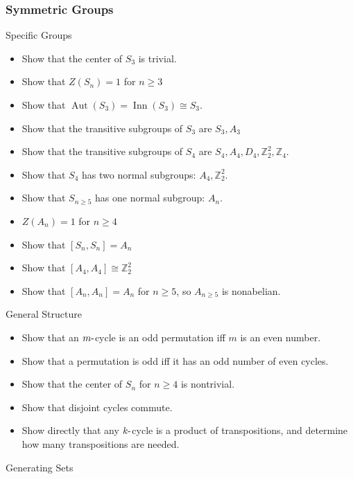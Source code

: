 \hypertarget{symmetric-groups}{%
\subsubsection{Symmetric Groups}\label{symmetric-groups}}

Specific Groups

\begin{itemize}
\tightlist
\item
  Show that the center of \(S_3\) is trivial.
\item
  Show that \(Z(S_n) = 1\) for \(n\geq 3\)
\item
  Show that
  \(\mathop{\mathrm{Aut}}(S_3) = \mathop{\mathrm{Inn}}(S_3) \cong S_3\).
\item
  Show that the transitive subgroups of \(S_3\) are \(S_3, A_3\)
\item
  Show that the transitive subgroups of \(S_4\) are
  \(S_4, A_4, D_4, {\mathbb{Z}}_2^2, {\mathbb{Z}}_4\).
\item
  Show that \(S_4\) has two normal subgroups: \(A_4, {\mathbb{Z}}_2^2\).
\item
  Show that \(S_{n\geq 5}\) has one normal subgroup: \(A_n\).
\item
  \(Z(A_n) = 1\) for \(n\geq 4\)
\item
  Show that \([S_n, S_n] = A_n\)
\item
  Show that \([A_4, A_4] \cong {\mathbb{Z}}_2^2\)
\item
  Show that \([A_n, A_n] = A_n\) for \(n\geq 5\), so \(A_{n\geq 5}\) is
  nonabelian.
\end{itemize}

General Structure

\begin{itemize}
\tightlist
\item
  Show that an \(m{\hbox{-}}\)cycle is an odd permutation iff \(m\) is
  an even number.
\item
  Show that a permutation is odd iff it has an odd number of even
  cycles.
\item
  Show that the center of \(S_n\) for \(n\geq 4\) is nontrivial.
\item
  Show that disjoint cycles commute.
\item
  Show directly that any \(k{\hbox{-}}\)cycle is a product of
  transpositions, and determine how many transpositions are needed.
\end{itemize}

Generating Sets

